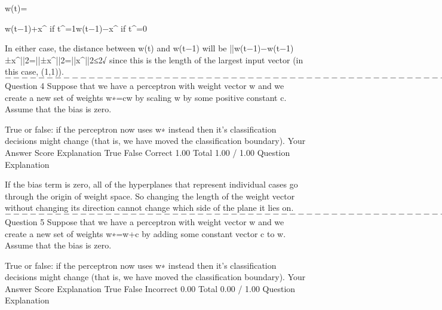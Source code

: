 w(t)={w(t−1)+x^ if t^=1w(t−1)−x^ if t^=0 

In either case, the distance between w(t) and w(t−1) will be ||w(t−1)−w(t−1)±x^||2=||±x^||2=||x^||2≤2√ since this is the length of the largest input vector (in this case, (1,1)).
$----------------------------------------------------------------------------$
Question 4
Suppose that we have a perceptron with weight vector w and we create a new set of weights w∗=cw by scaling w by some positive constant c. Assume that the bias is zero. 

True or false: if the perceptron now uses w∗ instead then it's classification decisions might change (that is, we have moved the classification boundary).
Your Answer		Score	Explanation
True			
False	Correct	1.00	
Total		1.00 / 1.00	
Question Explanation

If the bias term is zero, all of the hyperplanes that represent individual cases go through the origin of weight space. 
So changing the length of the weight vector without changing its direction cannot change which side of the plane it lies on.
$----------------------------------------------------------------------------$
Question 5
Suppose that we have a perceptron with weight vector w and we create a new set of weights w∗=w+c by adding some constant vector c to w. Assume that the bias is zero. 

True or false: if the perceptron now uses w∗ instead then it's classification decisions might change (that is, we have moved the classification boundary).
Your Answer		Score	Explanation
True			
False	Incorrect	0.00	
Total		0.00 / 1.00	
Question Explanation

}
